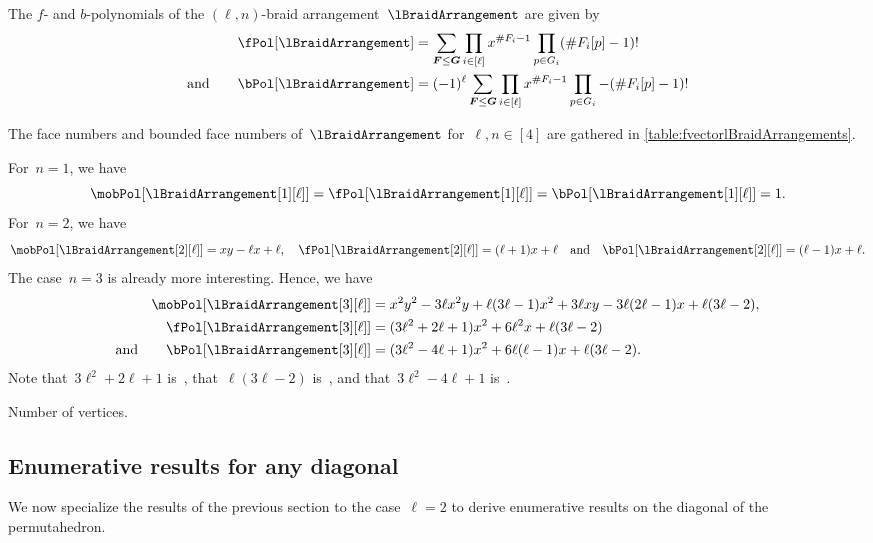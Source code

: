 \begin{corollary}
The $f$- and $b$-polynomials of the $(\ell,n)$-braid arrangement~$\lBraidArrangement$ are given by
\begin{align*}
\fPol[\lBraidArrangement] & = \sum_{\b{F} \le \b{G}} \prod_{i \in [\ell]} x^{\#F_i-1} \prod_{p \in G_i} (\# F_i[p]-1)!\\
\text{and}\qquad
\bPol[\lBraidArrangement] & = (-1)^\ell \sum_{\b{F} \le \b{G}} \prod_{i \in [\ell]} x^{\#F_i-1} \prod_{p \in G_i} -(\# F_i[p]-1)!
\end{align*}
\end{corollary}

The face numbers and bounded face numbers of~$\lBraidArrangement$ for~$\ell, n \in [4]$ are gathered in \cref{table:fvectorlBraidArrangements}.

\begin{example}[$n \le 3$]
For~$n = 1$, we have
\[
\mobPol[{\lBraidArrangement[1][\ell]}] = \fPol[{\lBraidArrangement[1][\ell]}] = \bPol[{\lBraidArrangement[1][\ell]}] = 1.
\]
For~$n = 2$, we have
\[
\mobPol[{\lBraidArrangement[2][\ell]}] = xy-\ell x+\ell,
\quad
\fPol[{\lBraidArrangement[2][\ell]}] = (\ell+1)x+\ell
\quad\text{and}\quad
\bPol[{\lBraidArrangement[2][\ell]}] = (\ell-1)x+\ell.
\]
The case~$n = 3$ is already more interesting.
Hence, we have
\begin{align*}
\mobPol[{\lBraidArrangement[3][\ell]}] & = x^2 y^2 - 3 \ell x^2 y + \ell (3 \ell - 1) x^2 + 3 \ell x y - 3 \ell (2 \ell - 1) x + \ell (3 \ell - 2) , \\
\fPol[{\lBraidArrangement[3][\ell]}] & = (3 \ell^2 + 2 \ell + 1) x^2 + 6 \ell^2 x + \ell (3 \ell - 2) \\
\text{and}\qquad
\bPol[{\lBraidArrangement[3][\ell]}] & = (3 \ell^2 - 4 \ell + 1) x^2 + 6 \ell (\ell - 1) x + \ell (3 \ell - 2).
\end{align*}
Note that~$3 \ell^2 + 2 \ell + 1$ is~, that~$\ell (3 \ell - 2)$ is~, and that~$3 \ell^2 - 4 \ell + 1$ is~.
\end{example}

\begin{theorem}
Number of vertices.
\end{theorem}

\subsection{Enumerative results for any diagonal} 
\label{s:facets}

We now specialize the results of the previous section to the case~$\ell = 2$ to derive enumerative results on the diagonal of the permutahedron.

